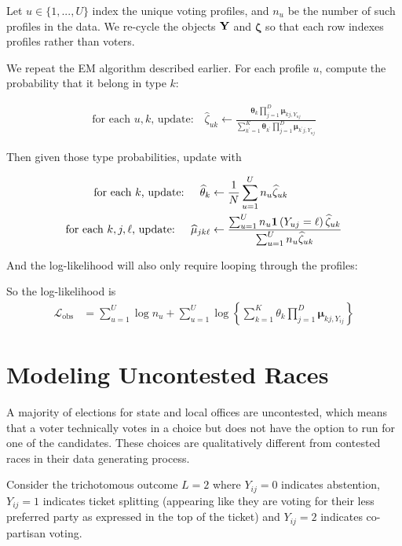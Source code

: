 \documentclass[11pt]{article}
\begin{document}
Let \(u \in \{1, ..., U\}\) index the unique voting profiles, and \(n_{u}\) be the number of such profiles in the data.  We re-cycle the objects \(\mathbf{Y}\) and \(\bm\zeta\) so that each row indexes profiles rather than voters.

We repeat the EM algorithm described earlier. For each profile \(u\), compute the probability that it belong in type \(k\):

\begin{align}
\text{for each \(u, k\), update: }~~~   \widehat\zeta_{uk} \leftarrow \frac{\bm{\theta}_{k}\prod^{D}_{j=1}\bm{\mu}_{kj,Y_{uj}}}
{\sum^{K}_{k^\prime=1}\bm{\theta}_{k^\prime}\prod^{D}_{j=1}\bm{\mu}_{k^\prime j,Y_{uj}}}
\end{align}

Then given those type probabilities, update with

\begin{align}
\text{for each \(k\), update: }~~~   \widehat{\theta}_{k} &\leftarrow \frac{1}{N}\sum^U_{u = 1}n_{u}\widehat{\zeta}_{uk}\\
\text{for each \(k, j, \ell\), update: }~~~   \widehat{\mu}_{jk\ell} &\leftarrow\frac{\sum^U_{u=1}n_{u}\bm{1}\left(Y_{uj} = \ell\right)\widehat{\zeta}_{uk}}{\sum^{U}_{u=1}n_{u}\widehat{\zeta}_{uk}}
\end{align}

And the log-likelihood will also only require looping through the profiles:

So the log-likelihood is
\begin{align}
\mathcal{L}_{\text{obs}} &= \sum^{U}_{u=1}\log n_u + \sum^{U}_{u=1}\log\left\{\sum^{K}_{k=1}\theta_k \prod^{D}_{j=1}\bm{\mu}_{kj,Y_{ij}}\right\}
\end{align}


\section{Modeling Uncontested Races} 

A majority of elections for state and local offices are uncontested, which means that a voter technically votes in a choice but does not have the option to run for one of the candidates. These choices are qualitatively different from contested races in their data generating process. 

Consider the trichotomous outcome \(L = 2\) where \(Y_{ij} = 0\) indicates abstention, \(Y_{ij} = 1\) indicates ticket splitting (appearing like they are voting for their less preferred party as expressed in the top of the ticket) and \(Y_{ij} = 2\) indicates co-partisan voting.  
\end{document}
